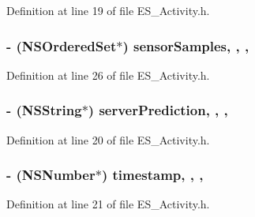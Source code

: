 Definition at line 19 of file E\+S\+\_\+\+Activity.\+h.

\hypertarget{interface_e_s___activity_aa7b0f298e21d72c89289080380c61e5f}{
\subsubsection[{sensor\+Samples}]{\setlength{\rightskip}{0pt plus 5cm}-\/ (N\+S\+Ordered\+Set$\ast$) sensor\+Samples\hspace{0.3cm}{\ttfamily [read]}, {\ttfamily [write]}, {\ttfamily [nonatomic]}, {\ttfamily [retain]}}}\label{interface_e_s___activity_aa7b0f298e21d72c89289080380c61e5f}


Definition at line 26 of file E\+S\+\_\+\+Activity.\+h.

\hypertarget{interface_e_s___activity_a9df3ca0381a39960cca5728b786f26d3}{
\subsubsection[{server\+Prediction}]{\setlength{\rightskip}{0pt plus 5cm}-\/ (N\+S\+String$\ast$) server\+Prediction\hspace{0.3cm}{\ttfamily [read]}, {\ttfamily [write]}, {\ttfamily [nonatomic]}, {\ttfamily [retain]}}}\label{interface_e_s___activity_a9df3ca0381a39960cca5728b786f26d3}


Definition at line 20 of file E\+S\+\_\+\+Activity.\+h.

\hypertarget{interface_e_s___activity_a92c04ad06e9e97b2631df34fb00debff}{
\subsubsection[{timestamp}]{\setlength{\rightskip}{0pt plus 5cm}-\/ (N\+S\+Number$\ast$) timestamp\hspace{0.3cm}{\ttfamily [read]}, {\ttfamily [write]}, {\ttfamily [nonatomic]}, {\ttfamily [retain]}}}\label{interface_e_s___activity_a92c04ad06e9e97b2631df34fb00debff}


Definition at line 21 of file E\+S\+\_\+\+Activity.\+h.

